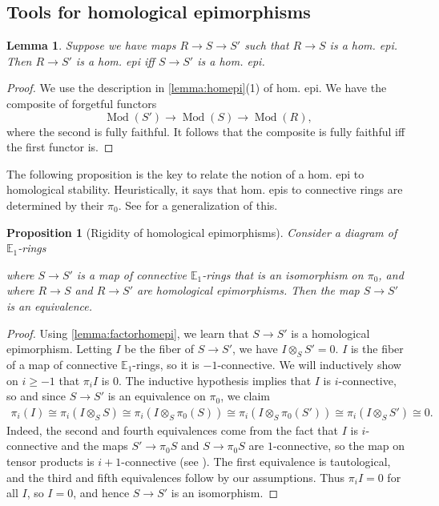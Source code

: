 \documentclass[12 pt]{amsart}
\theoremstyle{plain}
\newtheorem{proposition}[theorem]{Proposition}
\newtheorem{lemma}[theorem]{Lemma}
\theoremstyle{definition}
\theoremstyle{remark}
\numberwithin{equation}{section}
\DeclareMathOperator\Mod{Mod}
\newcommand\EE{\mathbb{E}}
\begin{document}
\subsection{Tools for homological epimorphisms}
\label{subsection:tools}

\begin{lemma}\label{lemma:factorhomepi}
	Suppose we have maps $R \to S \to S'$ such that $R \to S$ is a hom. epi. Then $R \to S'$ is a hom. epi iff $S \to S'$ is a hom. epi.
\end{lemma}

\begin{proof}
	We use the description in \autoref{lemma:homepi}(1) of hom. epi. We have the composite of forgetful functors
	$$\Mod(S') \to \Mod(S) \to \Mod(R),$$
	where the second is fully faithful. It follows that the composite is fully faithful iff the first functor is.
\end{proof}
The following proposition is the key to relate the notion of a hom. epi to homological stability. Heuristically, it says that hom. epis to connective rings are determined by their $\pi_0$. See \cite[Theorem B]{hebestreit2024notehigherringtheory} for a generalization of this.
\begin{proposition}[Rigidity of homological epimorphisms]\label{proposition:rigidity}
	Consider a diagram of $\EE_1$-rings
	\begin{center}
	\end{center}
	where $S \to S'$ is a map of connective $\EE_1$-rings that is an isomorphism on $\pi_0$, and where $R \to S$ and $R \to S'$ are homological epimorphisms. Then the map $S \to S'$ is an equivalence.
\end{proposition}

\begin{proof}
	Using \autoref{lemma:factorhomepi}, we learn that $S \to S'$ is a homological epimorphism. 	
	Letting $I$ be the fiber of $S \to S'$, we have $I \otimes_S S' = 0$. $I$ is the fiber of a
	map of connective $\EE_1$-rings, so it is $-1$-connective. We will
	inductively show on $i\geq-1$ that $\pi_iI$ is $0$. The inductive
	hypothesis implies that $I$ is $i$-connective, so and since $S \to S'$
	is an equivalence on $\pi_0$, we claim 
	\begin{align*}
		\pi_i(I) \cong \pi_i(I \otimes_S S) \cong
		\pi_i(I\otimes_S\pi_0(S)) \cong \pi_i(I\otimes_S\pi_0 (S'))
		\cong \pi_i(I\otimes_SS') \cong 0.
	\end{align*}
	Indeed, the second and fourth equivalences come from the fact that $I$ is
	$i$-connective and the maps $S' \to \pi_0S$ and $S \to \pi_0S$ are
	$1$-connective, so the map on tensor products is $i+1$-connective (see
	\cite[Lemma 3.1]{kk1}). The first equivalence is tautological, and the third and fifth equivalences follow by our
	assumptions. 
	Thus $\pi_i I=0$ for all $I$, so $I=0$, and hence $S \to S'$ is an isomorphism.
\end{proof}
\end{document}
